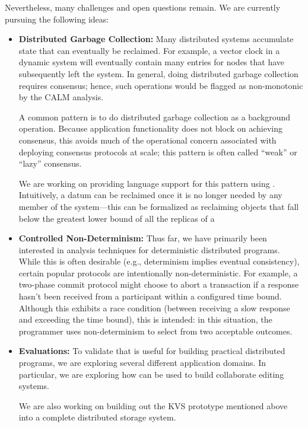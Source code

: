 Nevertheless, many challenges and open questions remain. We are currently
pursuing the following ideas:
\begin{itemize}
\item \textbf{Distributed Garbage Collection:} Many distributed systems
  accumulate state that can eventually be reclaimed. For example, a vector clock
  in a dynamic system will eventually contain many entries for nodes that have
  subsequently left the system. In general, doing distributed garbage collection
  requires consensus; hence, such operations would be flagged as non-monotonic
  by the CALM analysis.

  A common pattern is to do distributed garbage collection as a background
  operation. Because application functionality does not block on achieving
  consensus, this avoids much of the operational concern associated with
  deploying consensus protocols at scale; this pattern is often called ``weak''
  or ``lazy'' consensus.

  We are working on providing language support for this pattern using
  \blooml. Intuitively, a datum can be reclaimed once it is no longer needed by
  any member of the system---this can be formalized as reclaiming objects that
  fall below the greatest lower bound of all the replicas of a 

\item \textbf{Controlled Non-Determinism:} Thus far, we have primarily been
  interested in analysis techniques for deterministic distributed
  programs. While this is often desirable (e.g., determinism implies eventual
  consistency), certain popular protocols are intentionally
  non-deterministic. For example, a two-phase commit protocol might choose to
  abort a transaction if a response hasn't been received from a participant
  within a configured time bound. Although this exhibits a race condition
  (between receiving a slow response and exceeding the time bound), this is
  intended: in this situation, the programmer uses non-determinism to select
  from two acceptable outcomes.  

\item \textbf{Evaluations:} To validate that \blooml is useful for building
  practical distributed programs, we are exploring several different application
  domains. In particular, we are exploring how \blooml can be used to build
  collaborate editing systems.  

  We are also working on building out the KVS prototype mentioned above into a
  complete distributed storage system.  
\end{itemize}

